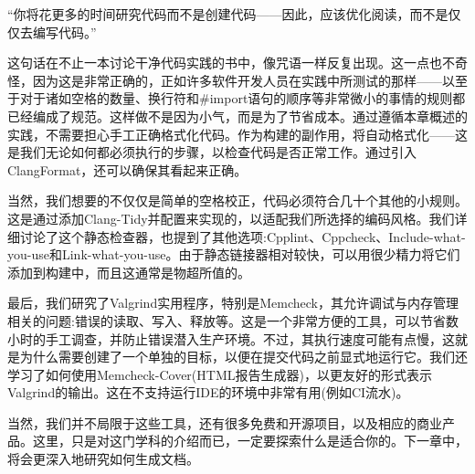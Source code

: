 “你将花更多的时间研究代码而不是创建代码——因此，应该优化阅读，而不是仅仅去编写代码。”

这句话在不止一本讨论干净代码实践的书中，像咒语一样反复出现。这一点也不奇怪，因为这是非常正确的，正如许多软件开发人员在实践中所测试的那样——以至于对于诸如空格的数量、换行符和\#import语句的顺序等非常微小的事情的规则都已经编成了规范。这样做不是因为小气，而是为了节省成本。通过遵循本章概述的实践，不需要担心手工正确格式化代码。作为构建的副作用，将自动格式化——这是我们无论如何都必须执行的步骤，以检查代码是否正常工作。通过引入ClangFormat，还可以确保其看起来正确。

当然，我们想要的不仅仅是简单的空格校正，代码必须符合几十个其他的小规则。这是通过添加Clang-Tidy并配置来实现的，以适配我们所选择的编码风格。我们详细讨论了这个静态检查器，也提到了其他选项:Cpplint、Cppcheck、Include-what-you-use和Link-what-you-use。由于静态链接器相对较快，可以用很少精力将它们添加到构建中，而且这通常是物超所值的。

最后，我们研究了Valgrind实用程序，特别是Memcheck，其允许调试与内存管理相关的问题:错误的读取、写入、释放等。这是一个非常方便的工具，可以节省数小时的手工调查，并防止错误潜入生产环境。不过，其执行速度可能有点慢，这就是为什么需要创建了一个单独的目标，以便在提交代码之前显式地运行它。我们还学习了如何使用Memcheck-Cover(HTML报告生成器)，以更友好的形式表示Valgrind的输出。这在不支持运行IDE的环境中非常有用(例如CI流水)。

当然，我们并不局限于这些工具，还有很多免费和开源项目，以及相应的商业产品。这里，只是对这门学科的介绍而已，一定要探索什么是适合你的。下一章中，将会更深入地研究如何生成文档。
